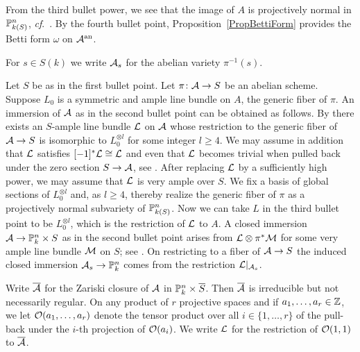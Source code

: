 From the third bullet power, we see that the image of $A$ is
projectively normal in ${\mathbb{P}}_{k(S)}^n$, \textit{cf}.~\cite[Theorem 9]{Mumford:quadeq}. By the fourth bullet point,
Proposition~\ref{PropBettiForm} provides the Betti form $\omega$ on
${\mathcal{A}}^{\mathrm{an}}$.


For $s\in S(k)$ we write $\mathcal{A}_s$ for the abelian variety $\pi^{-1}(s)$. 

\begin{remark}
\label{rmk:projembedding}
Let $S$ be as in the first bullet point. %
Let
$\pi \colon \mathcal{A} \rightarrow S$ be an abelian scheme.
Suppose $L_0$ is a 
symmetric and ample line bundle on $A$, the generic fiber of $\pi$.
An immersion of $\mathcal{A}$ as in the second bullet point can  be obtained
as follows. 
 By \cite[Th\'eor\`eme~XI~1.13]{LNM119}  there exists an
$S$-ample line bundle ${\mathcal L}$ on $\mathcal{A}$ whose restriction to the
generic fiber of $\mathcal{A}\rightarrow S$ is isomorphic to $L_0^{\otimes l}$
for some integer $l\ge 4$. 
We may assume in addition that ${\mathcal L}$
satisfies
$[-1]^* {\mathcal L} \cong {\mathcal L}$ and even that ${\mathcal L}$ becomes trivial when pulled back under the
zero section $S\rightarrow \mathcal{A}$, see \cite[Remarque~XI~1.3a]{LNM119}.
After replacing ${\mathcal L}$
by  a sufficiently high power, we may assume that ${\mathcal L}$ is very ample over
$S$.
We fix a basis of global sections of $L_0^{\otimes l}$ and, as $l\ge
4$, thereby
realize the
 generic fiber of $\pi$ as a projectively normal subvariety of 
${\mathbb{P}}_{k(S)}^n$.
Now we can take $L$ in the third bullet point to be $L_0^{\otimes l}$,
which is the restriction of ${\mathcal L}$ to $A$.
A closed immersion $\mathcal{A} \rightarrow {\mathbb{P}}^n_k \times S$ as in the second
bullet point %
 arises from 
${\mathcal L} \otimes \pi^*{\mathcal M}$ for some very ample line bundle ${\mathcal M}$ on $S$; see \cite[Proposition~4.4.10.(ii) and Proposition~4.1.4]{EGAII}.
On restricting to a fiber of $\mathcal{A}\rightarrow S$ the induced closed immersion  $\mathcal{A}_s\rightarrow{\mathbb{P}}^n_k$ comes from the restriction ${\mathcal L}|_{\mathcal{A}_s}$. 
\end{remark}


Write $\overline {\mathcal{A}}$ for the Zariski closure
of $\mathcal{A}$ in ${\mathbb{P}}_k^n\times \overline{S}$. Then $\overline {\mathcal{A}}$ is irreducible
but not necessarily regular.
On any product of $r$ projective spaces and if $a_1,\ldots,a_r\in{\mathbb{Z}}$,
we let  ${\mathcal O}(a_1,\ldots,a_r)$ denote the tensor product over all $i\in
\{1,\ldots, r\}$ of the
pull-back under the $i$-th projection of ${\mathcal O}(a_i)$. 
We write ${\mathcal L}$ for the restriction of ${\mathcal O}(1,1)$ to $\overline{\mathcal{A}}$. 

